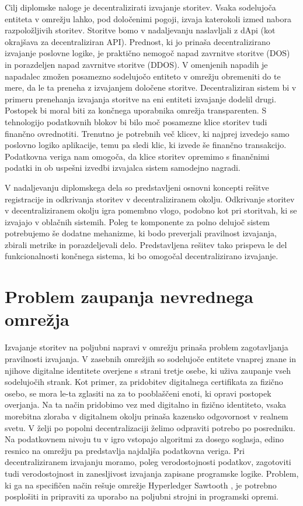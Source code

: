 \documentclass[a4paper, 12pt]{book}
\begin{document}
Cilj diplomske naloge je decentralizirati izvajanje storitev.
Vsaka sodelujoča entiteta v omrežju lahko, pod določenimi pogoji, izvaja katerokoli izmed nabora razpoložljivih storitev.
Storitve bomo v nadaljevanju naslavljali z dApi (kot okrajšava za decentraliziran API).
Prednost, ki jo prinaša decentralizirano izvajanje poslovne logike, je praktično nemogoč napad zavrnitve storitve (DOS) in porazdeljen napad zavrnitve storitve (DDOS).
V omenjenih napadih je napadalec zmožen posamezno sodelujočo entiteto v omrežju obremeniti do te mere, da le ta preneha z izvajanjem določene storitve.
Decentraliziran sistem bi v primeru prenehanja izvajanja storitve na eni entiteti izvajanje dodelil drugi.
Postopek bi moral biti za končnega uporabnika omrežja transparenten.
S tehnologijo podatkovnih blokov bi bilo moč posamezne klice storitev tudi finančno ovrednotiti.
Trenutno je potrebnih več klicev, ki najprej izvedejo samo poslovno logiko aplikacije, temu pa sledi klic, ki izvede še finančno transakcijo.
Podatkovna veriga nam omogoča, da klice storitev opremimo s finančnimi podatki in ob uspešni izvedbi izvajalca sistem samodejno nagradi.

V nadaljevanju diplomskega dela so predstavljeni osnovni koncepti rešitve registracije in odkrivanja storitev v decentraliziranem okolju.
Odkrivanje storitev v decentraliziranem okolju igra pomembno vlogo, podobno kot pri storitvah, ki se izvajajo v oblačnih sistemih.
Poleg te komponente za polno delujoč sistem potrebujemo še dodatne mehanizme, ki bodo preverjali pravilnost izvajanja, zbirali metrike in porazdeljevali delo.
Predstavljena rešitev tako prispeva le del funkcionalnosti končnega sistema, ki bo omogočal decentralizirano izvajanje.

\section{Problem zaupanja nevrednega omrežja}
Izvajanje storitev na poljubni napravi v omrežju prinaša problem zagotavljanja pravilnosti izvajanja.
V zasebnih omrežjih so sodelujoče entitete vnaprej znane in njihove digitalne identitete overjene s strani tretje osebe, ki uživa zaupanje vseh sodelujočih strank.
Kot primer, za pridobitev digitalnega certifikata za fizično osebo, se mora le-ta zglasiti na za to pooblaščeni enoti, ki opravi postopek overjanja.
Na ta način pridobimo vez med digitalno in fizično identiteto, vsaka morebitna zloraba v digitalnem okolju prinaša kazensko odgovornost v realnem svetu.
V želji po popolni decentralizaciji želimo odpraviti potrebo po posredniku.
Na podatkovnem nivoju tu v igro vstopajo algoritmi za dosego soglasja, edino resnico na omrežju pa predstavlja najdaljša podatkovna veriga.
Pri decentraliziranem izvajanju moramo, poleg verodostojnosti podatkov, zagotoviti tudi verodostojnost in zanesljivost izvajanja zapisane programske logike.
Problem, ki ga na specifičen način rešuje omrežje Hyperledger Sawtooth \cite{sawtooth}, je potrebno posplošiti in pripraviti za uporabo na poljubni strojni in programski opremi.
\end{document}
